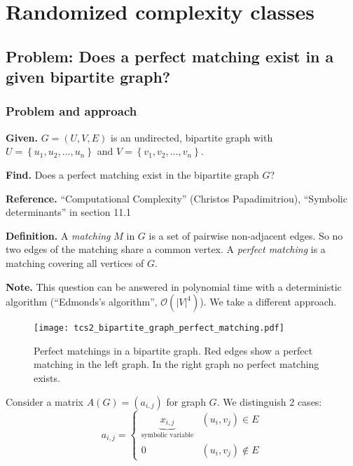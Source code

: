 \documentclass[a4paper]{article}
\newcommand{\given}[1]{\textbf{Given.} #1\par}
\newcommand{\find}[1]{\textbf{Find.} #1\par}
\newcommand{\card}[1]{|#1|}
\newcommand{\set}[1]{\left\{#1\right\}}
\newenvironment{spec}[0]{\begin{framed}}{\end{framed}}
\newenvironment{definition}[0]{\textbf{Definition.}}{}
\begin{document}
\setlength{\parskip}{0.8\baselineskip}
\newpage


\section{Randomized complexity classes}
\subsection{Problem: Does a perfect matching exist in a given bipartite graph?}
\label{sec:perfect-matching-algorithm}
%
\subsubsection{Problem and approach}
%
\begin{spec}
  \given{$G = (U, V, E)$ is an undirected, bipartite graph with $U = \set{u_1, u_2, \ldots, u_n}$ and $V = \set{v_1, v_2, \ldots, v_n}$.}
  \find{Does a perfect matching exist in the bipartite graph $G$?}
  \textbf{Reference.} ``Computational Complexity'' (Christos Papadimitriou), ``Symbolic determinants'' in section 11.1
\end{spec}
\begin{definition}
  A \emph{matching} $M$ in $G$ is a set of pairwise non-adjacent edges. So no two edges of the matching share a common vertex. A \emph{perfect matching} is a matching covering all vertices of $G$.
\end{definition}

\textbf{Note.} This question can be answered in polynomial time with a deterministic algorithm (``Edmonds's algorithm'', $\mathcal{O}(\card{V}^4)$). We take a different approach.

\begin{figure}[h]
  \begin{center}
    \texttt{[image: tcs2\_bipartite\_graph\_perfect\_matching.pdf]}
    \caption{Perfect matchings in a bipartite graph. Red edges show a perfect matching in the left graph. In the right graph no perfect matching exists.}
  \end{center}
\end{figure}

Consider a matrix $A(G) = (a_{i,j})$ for graph $G$. We distinguish 2 cases:
\[
  a_{i,j} = \left\{\begin{array}{cl}
    \underbrace{x_{i,j}}_{\text{symbolic variable}} & (u_i, v_j) \in E  \\
    0 & (u_i, v_j) \notin E
  \end{array}\right.
\]
\end{document}
